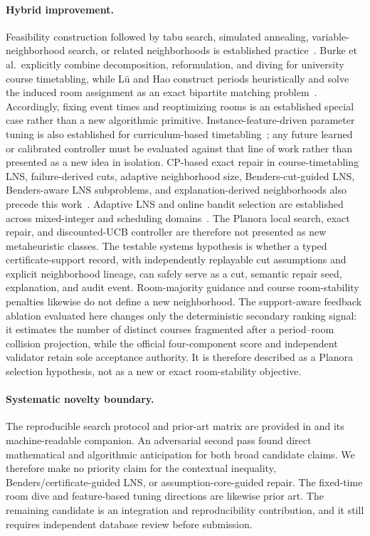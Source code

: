 \paragraph{Hybrid improvement.}
Feasibility construction followed by tabu search, simulated annealing, variable-neighborhood search, or related neighborhoods is established practice~\cite{lewis2008metaheuristics,muller2009hybrid}.
Burke et al.\ explicitly combine decomposition, reformulation, and diving for university course timetabling, while L{\"u} and Hao construct periods heuristically and solve the induced room assignment as an exact bipartite matching problem~\cite{burke2010diving,lu2008hybrid}.
Accordingly, fixing event times and reoptimizing rooms is an established special case rather than a new algorithmic primitive.
Instance-feature-driven parameter tuning is also established for curriculum-based timetabling~\cite{bellio2016feature}; any future learned or calibrated controller must be evaluated against that line of work rather than presented as a new idea in isolation.
CP-based exact repair in course-timetabling LNS, failure-derived cuts, adaptive neighborhood size, Benders-cut-guided LNS, Benders-aware LNS subproblems, and explanation-derived neighborhoods also precede this work~\cite{cambazard2012cp,nagata2018random,trick2011benderslns,maher2021benderslns,prudhomme2014explanationlns}.
Adaptive LNS and online bandit selection are established across mixed-integer and scheduling domains~\cite{ropke2006alns,hendel2022alns,phan2024balance,cai2025balans}.
The Planora local search, exact repair, and discounted-UCB controller are therefore not presented as new metaheuristic classes.
The testable systems hypothesis is whether a typed certificate-support record, with independently replayable cut assumptions and explicit neighborhood lineage, can safely serve as a cut, semantic repair seed, explanation, and audit event.
Room-majority guidance and course room-stability penalties likewise do not define a new neighborhood.
The support-aware feedback ablation evaluated here changes only the deterministic secondary ranking signal: it estimates the number of distinct courses fragmented after a period--room collision projection, while the official four-component score and independent validator retain sole acceptance authority.
It is therefore described as a Planora selection hypothesis, not as a new or exact room-stability objective.

\paragraph{Systematic novelty boundary.}
The reproducible search protocol and prior-art matrix are provided in  and its machine-readable companion.
An adversarial second pass found direct mathematical and algorithmic anticipation for both broad candidate claims.
We therefore make no priority claim for the contextual inequality, Benders/certificate-guided LNS, or assumption-core-guided repair.
The fixed-time room dive and feature-based tuning directions are likewise prior art.
The remaining candidate is an integration and reproducibility contribution, and it still requires independent database review before submission.

